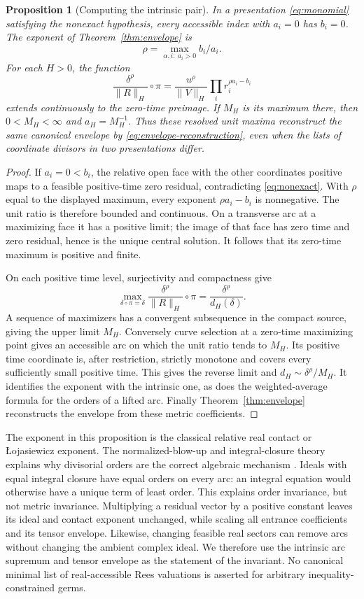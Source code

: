 \documentclass[11pt,reqno]{amsart}
\numberwithin{equation}{section}
\newtheorem{proposition}[theorem]{Proposition}
\theoremstyle{definition}
\theoremstyle{remark}
\begin{document}
\begin{proposition}[Computing the intrinsic pair]\label{prop:divisorial}
In a presentation \eqref{eq:monomial} satisfying the nonexact hypothesis, every accessible index with $a_i=0$ has $b_i=0$. The exponent of Theorem~\ref{thm:envelope} is
\[
 \rho=\max_{\alpha,i:\ a_i>0}b_i/a_i.
\]
For each $H>0$, the function
\[
 \frac{\delta^\rho}{\|R\|_H}\circ\pi
   =\frac{u^\rho}{\|V\|_H}\prod_i r_i^{\rho a_i-b_i}
\]
extends continuously to the zero-time preimage. If $M_H$ is its maximum there, then $0<M_H<\infty$ and $a_H=M_H^{-1}$. Thus these resolved unit maxima reconstruct the same canonical envelope by \eqref{eq:envelope-reconstruction}, even when the lists of coordinate divisors in two presentations differ.
\end{proposition}
\begin{proof}
If $a_i=0<b_i$, the relative open face with the other coordinates positive maps to a feasible positive-time zero residual, contradicting \eqref{eq:nonexact}. With $\rho$ equal to the displayed maximum, every exponent $\rho a_i-b_i$ is nonnegative. The unit ratio is therefore bounded and continuous. On a transverse arc at a maximizing face it has a positive limit; the image of that face has zero time and zero residual, hence is the unique central solution. It follows that its zero-time maximum is positive and finite.

On each positive time level, surjectivity and compactness give
\[
 \max_{\delta\circ\pi=\delta}\frac{\delta^\rho}{\|R\|_H}\circ\pi
       =\frac{\delta^\rho}{d_H(\delta)}.
\]
A sequence of maximizers has a convergent subsequence in the compact source, giving the upper limit $M_H$. Conversely curve selection at a zero-time maximizing point gives an accessible arc on which the unit ratio tends to $M_H$. Its positive time coordinate is, after restriction, strictly monotone and covers every sufficiently small positive time. This gives the reverse limit and $d_H\sim\delta^\rho/M_H$. It identifies the exponent with the intrinsic one, as does the weighted-average formula for the orders of a lifted arc. Finally Theorem~\ref{thm:envelope} reconstructs the envelope from these metric coefficients.
\end{proof}

The exponent in this proposition is the classical relative real contact or \L{}ojasiewicz exponent. The normalized-blow-up and integral-closure theory explains why divisorial orders are the correct algebraic mechanism \cite{LJT}. Ideals with equal integral closure have equal orders on every arc: an integral equation would otherwise have a unique term of least order. This explains order invariance, but not metric invariance. Multiplying a residual vector by a positive constant leaves its ideal and contact exponent unchanged, while scaling all entrance coefficients and its tensor envelope. Likewise, changing feasible real sectors can remove arcs without changing the ambient complex ideal. We therefore use the intrinsic arc supremum and tensor envelope as the statement of the invariant. No canonical minimal list of real-accessible Rees valuations is asserted for arbitrary inequality-constrained germs.
\end{document}
